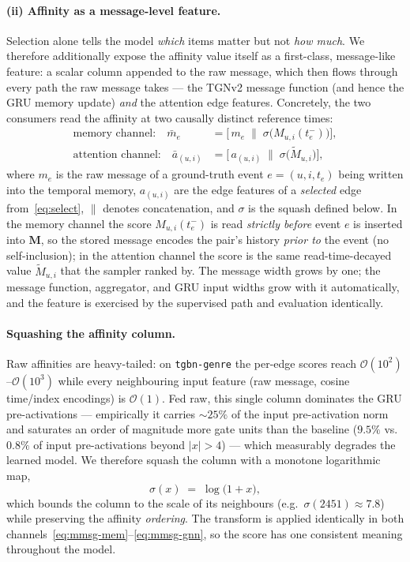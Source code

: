 \paragraph{(ii) Affinity as a message-level feature.}
Selection alone tells the model \emph{which} items matter but not \emph{how much}.
We therefore additionally expose the affinity value itself as a first-class,
message-like feature: a scalar column appended to the raw message, which then flows
through every path the raw message takes --- the TGNv2 message function (and hence
the GRU memory update) \emph{and} the attention edge features. Concretely, the two
consumers read the affinity at two causally distinct reference times:
\begin{align}
\text{memory channel:}\quad
\bar{m}_e &= \bigl[\, m_e \;\|\; \sigma\!\bigl(M_{u,i}(t_e^{-})\bigr) \bigr],
\label{eq:mmsg-mem}\\
\text{attention channel:}\quad
\bar{a}_{(u,i)} &= \bigl[\, a_{(u,i)} \;\|\; \sigma\!\bigl(\tilde M_{u,i}\bigr) \bigr],
\label{eq:mmsg-gnn}
\end{align}
where $m_e$ is the raw message of a ground-truth event $e=(u,i,t_e)$ being written
into the temporal memory, $a_{(u,i)}$ are the edge features of a \emph{selected}
edge from~\eqref{eq:select}, $\|$ denotes concatenation, and $\sigma$ is the squash
defined below. In the memory channel the score $M_{u,i}(t_e^{-})$ is read
\emph{strictly before} event $e$ is inserted into $\mathbf{M}$, so the stored
message encodes the pair's history \emph{prior to} the event (no self-inclusion); in
the attention channel the score is the same read-time-decayed value
$\tilde M_{u,i}$ that the sampler ranked by. The message width grows by one; the
message function, aggregator, and GRU input widths grow with it automatically, and
the feature is exercised by the supervised path and evaluation identically.

\paragraph{Squashing the affinity column.}
Raw affinities are heavy-tailed: on \texttt{tgbn-genre} the per-edge scores reach
$\mathcal{O}(10^{2})$--$\mathcal{O}(10^{3})$ while every neighbouring input feature
(raw message, cosine time/index encodings) is $\mathcal{O}(1)$. Fed raw, this single
column dominates the GRU pre-activations --- empirically it carries ${\sim}25\%$ of
the input pre-activation norm and saturates an order of magnitude more gate units
than the baseline ($9.5\%$ vs.\ $0.8\%$ of input pre-activations beyond $|x|>4$) ---
which measurably degrades the learned model. We therefore squash the column with a
monotone logarithmic map,
\begin{equation}
\sigma(x) \;=\; \log\bigl(1 + x\bigr),
\label{eq:log1p}
\end{equation}
which bounds the column to the scale of its neighbours (e.g.\ $\sigma(2451)\approx
7.8$) while preserving the affinity \emph{ordering}. The transform is applied
identically in both channels~\eqref{eq:mmsg-mem}--\eqref{eq:mmsg-gnn}, so the score
has one consistent meaning throughout the model.

